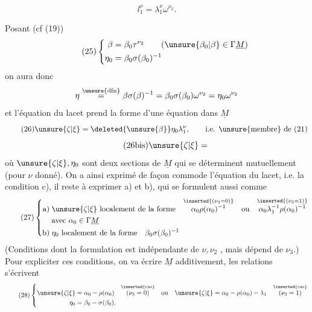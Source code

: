 
\[
\tag{24} l_1^\nu=\lambda_1^\nu\omega^{\nu_2}.
\]

Posant (cf (19))
\[
\tag{25}
\left\{\begin{aligned}
\beta&=\beta_0\tau^{\nu_2}\qquad(\unsure{\beta_0|\beta}\in\Gamma\underline M)\\
\eta_0&=\beta_0\sigma(\beta_0)^{-1}
\end{aligned}\right.
\]
on aura donc
\[
\eta\overset{\unsure{\mathrm{dfn}}}{=}
\beta\sigma(\beta)^{-1}
=\beta_0\sigma(\beta_0)\omega^{\nu_2}
=\eta_0\omega^{\nu_2}
\]
et l'équation du lacet prend la forme
d'une équation dans $\underline M$
\[
\tag{26}
\unsure{\zeta|\xi}=\deleted{\unsure{\beta}}\eta_0\lambda_1^\nu,
\qquad\text{i.e. \unsure{membre} de (21)}
\]
\[
\tag{26bis}\unsure{\zeta|\xi}=
\]
où $\unsure{\zeta|\xi},\eta_0$ sont deux sections de $\underline M$ qui
se déterminent mutuellement (pour $\nu$
donné). On a ainsi exprimé de façon
commode l'équation du lacet, i.e. la
condition c), il reste à exprimer a) et b),
qui se formulent aussi comme
\[
\tag{27}
\left\{\begin{aligned}
\text{a)}\;&\unsure{\zeta|\xi}\ \text{localement de la forme}\quad
\overset{\inserted{(\nu_3=0)}}{\alpha_0\rho(\alpha_0)^{-1}}
\quad\text{ou}\quad
\overset{\inserted{(\nu_3=1)}}{\alpha_0\lambda_1^{-1}\rho(\alpha_0)^{-1}}\\
&\text{avec }\alpha_0\in\Gamma\underline M\\
\text{b)}\;&\eta_0\ \text{localement de la forme}\quad\beta_0\sigma(\beta_0)^{-1}
\end{aligned}\right.
\]
(Conditions dont la formulation est indépendante
de $\nu,\nu_2$ , mais dépend  de
$\nu_3$.) Pour expliciter ces conditions, on
va écrire $\underline M$ additivement, les relations
s'écrivent
\[
\tag{28}
\left\{\begin{aligned}
\unsure{\zeta|\xi}&=\alpha_0-\rho(\alpha_0)
\quad\overset{\inserted{\text{cas}}}{(\nu_3=0)}
\quad\text{ou}\quad
\unsure{\zeta|\xi}=\alpha_0-\rho(\alpha_0)-\lambda_1
\quad\overset{\inserted{\text{cas}}}{(\nu_3=1)}\\
\eta_0&=\beta_0-\sigma(\beta_0),
\end{aligned}\right.
\]


